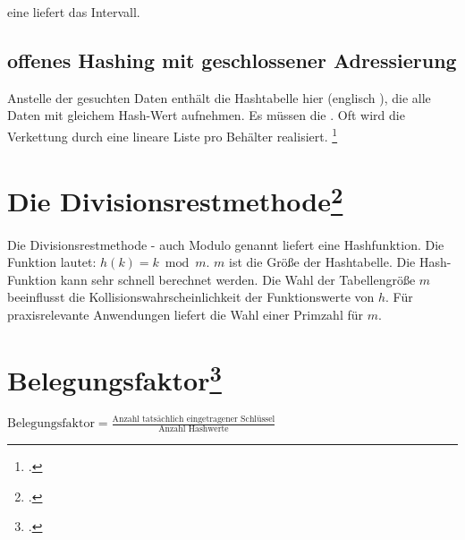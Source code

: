 \documentclass{bschlangaul-theorie}
\begin{document}
eine  liefert das Intervall.

%

\subsection{offenes Hashing mit geschlossener Adressierung}

Anstelle der gesuchten Daten enthält die Hashtabelle hier
 (englisch ), die alle Daten mit gleichem
Hash-Wert aufnehmen. Es müssen die . Oft wird die Verkettung durch eine lineare Liste pro
Behälter realisiert.
\footcite{wiki:hashtabelle}

%

\section{Die Divisionsrestmethode\footcite{wiki:divisionsrestmethode}}

Die Divisionsrestmethode - auch Modulo genannt liefert eine
Hashfunktion. Die Funktion lautet:  $h(k)=k{\bmod {m}}$. $m$ ist die
Größe der Hashtabelle. Die Hash-Funktion kann sehr schnell berechnet
werden. Die Wahl der Tabellengröße $m$ beeinflusst die
Kollisionswahrscheinlichkeit der Funktionswerte von $h$. Für
praxisrelevante Anwendungen liefert die Wahl einer Primzahl für $m$.

\section{Belegungsfaktor\footcite[Seite 29]{aud:fs:tafeluebung-10}}

$\text{Belegungsfaktor} =
\frac{\text{Anzahl tatsächlich eingetragener Schlüssel}}
{\text{Anzahl Hashwerte}}$

\literatur
\end{document}
